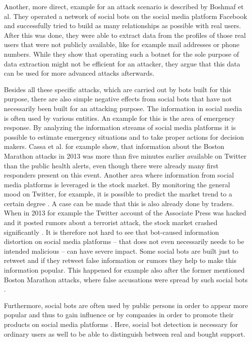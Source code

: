 Another, more direct, example for an attack scenario is described by Boshmaf et al. \cite{boshmaf13} They operated a network of social bots on the social media platform Facebook and successfully tried to build as many relationships as possible with real users. After this was done, they were able to extract data from the profiles of those real users that were not publicly available, like for example mail addresses or phone numbers. While they show that operating such a botnet for the sole purpose of data extraction might not be efficient for an attacker, they argue that this data can be used for more advanced attacks afterwards.

Besides all these specific attacks, which are carried out by bots built for this purpose, there are also simple negative effects from social bots that have not necessarily been built for an attacking purpose.
The information in social media is often used by various entities. An example for this is the area of emergency response. By analyzing the information streams of social media platforms it is possible to estimate emergency situations and to take proper actions for decision makers. Cassa et al. \cite{cassa} for example show, that information about the Boston Marathon attacks in 2013 was more than five minutes earlier available on Twitter than the public health alerts, even though there were already many first responders present on this event.  Another area where information from social media platforms is leveraged is the stock market. By monitoring the general mood on Twitter, for example, it is possible to predict the market trend to a certain degree \cite{bollen}. A case can be made that this is also already done by traders. When in 2013 for example the Twitter account of the Associate Press was hacked and it posted rumors about a terrorist attack, the stock market crashed significantly \cite{ferrara15}. It is therefore not hard to see that bot-caused information distortion on social media platforms -- that does not even necessarily needs to be intended malicious -- can have severe impact. Some social bots are built just to retweet and if they retweet false information or rumors they help to make this information popular. This happened for example also after the former mentioned Boston Marathon attacks, where false accusations were spread by such social bots \cite{gupta}. 

Furthermore, social bots are often used by public persons in order to appear more popular and thus to gain influence or by companies in order to promote their products on social media platforms \cite{stringhini}. Here, social bot detection is necessary for ordinary users as well to be able to distinguish between real and bought support.

